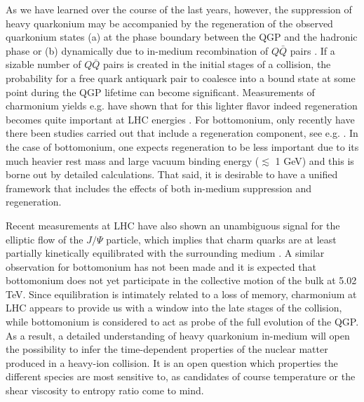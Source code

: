 As we have learned over the course of the last years, however, the suppression of heavy quarkonium may be accompanied by the regeneration of the observed quarkonium states (a) at the phase boundary between the QGP and the hadronic phase \cite{BraunMunzinger:2000ep,Thews:2000rj,Grandchamp:2002wp} or (b) dynamically due to in-medium recombination of $Q\bar{Q}$ pairs \cite{Young:2008he,*Young:2009tj,Emerick:2011xu}. If a sizable number of $Q\bar{Q}$ pairs is created in the initial stages of a collision, the probability for a free quark antiquark pair to coalesce into a bound state at some point during the QGP lifetime can become significant. Measurements of charmonium yields e.g. have shown that for this lighter flavor indeed regeneration becomes quite important at LHC energies \cite{Rapp:2017chc}. For bottomonium, only recently have there been studies carried out that include a regeneration component, see e.g. \cite{Du:2017qkv}.  In the case of bottomonium, one expects regeneration to be less important due to its much heavier rest mass and large vacuum binding energy ($\lesssim$ 1 GeV) and this is borne out by detailed calculations.  That said, it is desirable to have a unified framework that includes the effects of both in-medium suppression and regeneration.

Recent measurements at LHC have also shown an unambiguous signal for the elliptic flow of the $J/\Psi$ particle, which implies that charm quarks are at least partially kinetically equilibrated with the surrounding medium \cite{ALICE:2013xna,Liu:2009gx,Zhao:2012gc}. A similar observation for bottomonium has not been made and it is expected that bottomonium does not yet participate in the collective motion of the bulk at 5.02 TeV. Since equilibration is intimately related to a loss of memory, charmonium at LHC appears to provide us with a window into the late stages of the collision, while bottomonium is considered to act as probe of the full evolution of the QGP.  As a result, a detailed understanding of heavy quarkonium in-medium will open the possibility to infer the time-dependent properties of the nuclear matter produced in a heavy-ion collision. It is an open question which properties the different species are most sensitive to, as candidates of course temperature or the shear viscosity to entropy ratio come to mind. 


